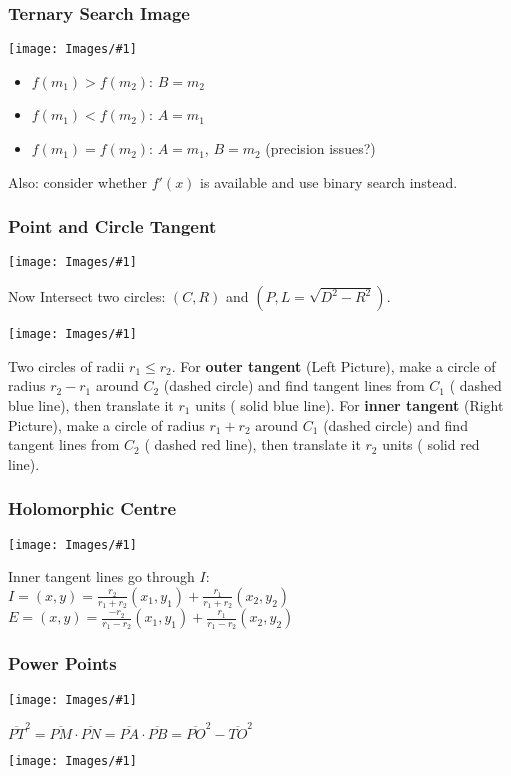 \documentclass[landscape,10pt]{article}
\newcommand{\myimage}[2]{\begin{center}\texttt{[image: Images/\#1]}\end{center}}
\begin{document}
\begin{multicols*}{2}

\subsubsection*{Ternary Search Image}
\myimage{ternarysearch.png}{1.25in}
\begin{itemize}
\item $f(m_1) > f(m_2)$: $B = m_2$
\item $f(m_1) < f(m_2)$: $A = m_1$
\item $f(m_1) = f(m_2)$: $A = m_1$, $B = m_2$  (precision issues?)
\end{itemize}
Also: consider whether $f'(x)$ is available and use binary search instead.

\subsubsection*{Point and Circle Tangent}
\myimage{point_tangent.png}{1.25in}
Now Intersect two circles: $(C,R)$ and $(P,L=\sqrt{D^2-R^2})$.

\myimage{cir_cir_tang.png}{1.25in}
Two circles of radii $r_1 \leq r_2$. For {\bf outer tangent} (Left Picture), make a circle of radius $r_2-r_1$ around $C_2$ (dashed circle) and find tangent lines from $C_1$ ({\color{blue} dashed blue line}), then translate it $r_1$ units ({\color{blue} solid blue line}). For {\bf inner tangent} (Right Picture), make a circle of radius $r_1+r_2$ around $C_1$ (dashed circle) and find tangent lines from $C_2$ ({\color{red} dashed red line}), then translate it $r_2$ units ({\color{red} solid red line}).

\subsubsection*{Holomorphic Centre}
\myimage{holo_centre.pdf}{1.5in}
Inner tangent lines go through $I$: \\
$I = (x,y) = \frac{r_2}{r_1+r_2}(x_1,y_1) + \frac{r_1}{r_1+r_2}(x_2,y_2)$ \hskip 20pt
$E = (x,y) = \frac{-r_2}{r_1-r_2}(x_1,y_1) + \frac{r_1}{r_1-r_2}(x_2,y_2)$

\subsubsection*{Power Points}
\myimage{power_point.pdf}{1.5in}
$\overline{PT}^2 = \overline{PM} \cdot \overline{PN} = \overline{PA} \cdot \overline{PB} = \overline{PO}^2 - \overline{TO}^2$

\myimage{Inspiration.jpg}{1.3in}

\end{multicols*}
\end{document}

